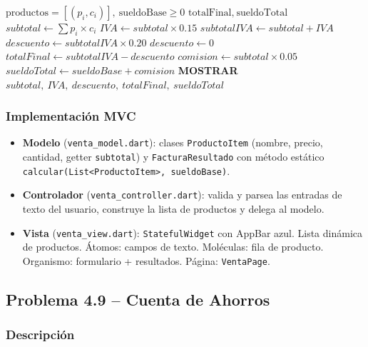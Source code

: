 \documentclass[12pt,a4paper]{article}
\begin{document}
\begin{algorithm}[H]
\caption{Cálculo de Factura con IVA, Descuento y Comisión}
\label{alg:venta}
\begin{algorithmic}[1]
  \Require $\text{productos} = [(p_i, c_i)],\ \text{sueldoBase} \geq 0$
  \Ensure $\text{totalFinal},\ \text{sueldoTotal}$
  \State $subtotal \leftarrow \sum p_i \times c_i$
  \State $IVA \leftarrow subtotal \times 0.15$
  \State $subtotalIVA \leftarrow subtotal + IVA$
    \State $descuento \leftarrow subtotalIVA \times 0.20$
  \Else
    \State $descuento \leftarrow 0$
  \EndIf
  \State $totalFinal \leftarrow subtotalIVA - descuento$
  \State $comision \leftarrow subtotal \times 0.05$
  \State $sueldoTotal \leftarrow sueldoBase + comision$
  \State \textbf{MOSTRAR} $subtotal,\ IVA,\ descuento,\ totalFinal,\ sueldoTotal$
\end{algorithmic}
\end{algorithm}

\subsubsection{Implementación MVC}

\begin{itemize}
  \item \textbf{Modelo} (\texttt{venta\_model.dart}): clases \texttt{ProductoItem} (nombre, precio, cantidad, getter \texttt{subtotal}) y \texttt{FacturaResultado} con método estático \texttt{calcular\allowbreak(List<\allowbreak{}ProductoItem>,~sueldoBase)}.
  \item \textbf{Controlador} (\texttt{venta\_controller.dart}): valida y parsea las entradas de texto del usuario, construye la lista de productos y delega al modelo.
  \item \textbf{Vista} (\texttt{venta\_view.dart}): \texttt{StatefulWidget} con AppBar azul. Lista dinámica de productos. Átomos: campos de texto. Moléculas: fila de producto. Organismo: formulario + resultados. Página: \texttt{VentaPage}.
\end{itemize}

\subsection{Problema 4.9 -- Cuenta de Ahorros}

\subsubsection{Descripción}
\end{document}
